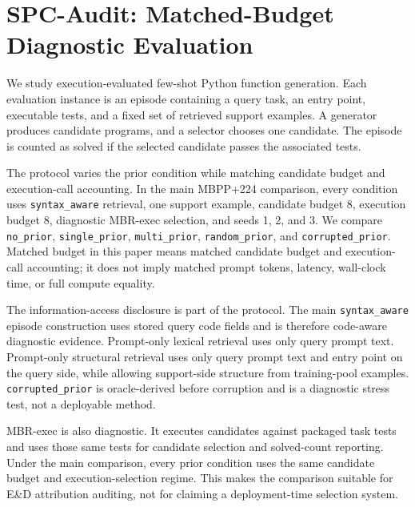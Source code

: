 \documentclass{article}
\newcommand{\code}[1]{\texttt{#1}}
\begin{document}
\section{SPC-Audit: Matched-Budget Diagnostic Evaluation}
We study execution-evaluated few-shot Python function generation. Each evaluation instance is an episode containing a query task, an entry point, executable tests, and a fixed set of retrieved support examples. A generator produces candidate programs, and a selector chooses one candidate. The episode is counted as solved if the selected candidate passes the associated tests.

The protocol varies the prior condition while matching candidate budget and execution-call accounting. In the main MBPP+224 comparison, every condition uses \code{syntax\_aware} retrieval, one support example, candidate budget 8, execution budget 8, diagnostic MBR-exec selection, and seeds 1, 2, and 3. We compare \code{no\_prior}, \code{single\_prior}, \code{multi\_prior}, \code{random\_prior}, and \code{corrupted\_prior}. Matched budget in this paper means matched candidate budget and execution-call accounting; it does not imply matched prompt tokens, latency, wall-clock time, or full compute equality.

The information-access disclosure is part of the protocol. The main \code{syntax\_aware} episode construction uses stored query code fields and is therefore code-aware diagnostic evidence. Prompt-only lexical retrieval uses only query prompt text. Prompt-only structural retrieval uses only query prompt text and entry point on the query side, while allowing support-side structure from training-pool examples. \code{corrupted\_prior} is oracle-derived before corruption and is a diagnostic stress test, not a deployable method.

MBR-exec is also diagnostic. It executes candidates against packaged task tests and uses those same tests for candidate selection and solved-count reporting. Under the main comparison, every prior condition uses the same candidate budget and execution-selection regime. This makes the comparison suitable for E\&D attribution auditing, not for claiming a deployment-time selection system.
\end{document}

